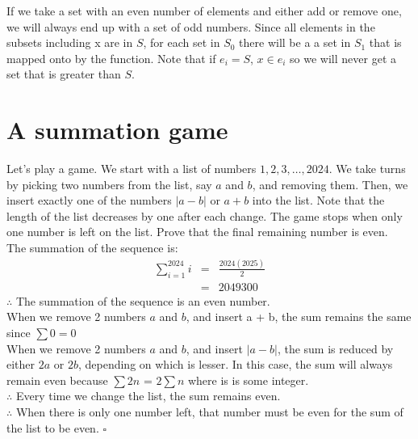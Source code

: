 \documentclass{article}
\begin{document}
    If we take a set with an even number of elements and either add or remove one, we will always end up with a set of odd numbers. Since all elements in the subsets including x are in $S$, for each set in $S_0$ there will be a a set in $S_1$ that is mapped onto by the function. Note that if $e_i = S$, $x \in e_i$ so we will never get a set that is greater than $S$.

\section{A summation game}
Let's play a game. We start with a list of numbers $1, 2, 3, \dots, 2024$. We take turns by picking two numbers from the list, say $a$ and $b$, and removing them. Then, we insert exactly one of the numbers $|a-b|$ or $a+b$ into the list. Note that the length of the list decreases by one after each change. The game stops when only one number is left on the list. Prove that the final remaining number is even. \\
The summation of the sequence is:
\begin{eqnarray*}
    \sum_{i=1}^{2024} i & = & \frac{2024(2025)}{2} \\
    & = & 2049300
\end{eqnarray*}
$\therefore$ The summation of the sequence is an even number. \\
When we remove 2 numbers $a$ and $b$, and insert a + b, the sum remains the same since $\sum 0 = 0$ \\
When we remove 2 numbers $a$ and $b$, and insert $|a-b|$, the sum is reduced by either $2a$ or $2b$, depending on which is lesser. In this case, the sum will always remain even because $\sum 2n$ = $2\sum n$ where is is some integer. \\
$\therefore$ Every time we change the list, the sum remains even.\\
$\therefore$ When there is only one number left, that number must be even for the sum of the list to be even. $\square$
\end{document}
